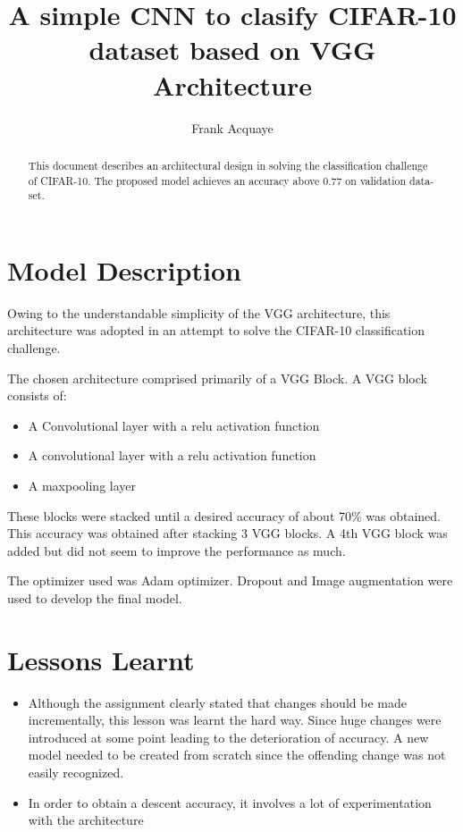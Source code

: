 \documentclass[]{article}
\title{A simple CNN to clasify CIFAR-10 dataset based on VGG Architecture}
\author{Frank Acquaye}
\begin{document}
\maketitle

\begin{abstract}
This document describes an architectural design in solving the classification challenge of CIFAR-10. The proposed model achieves an accuracy above 0.77 on validation data-set.
\end{abstract}

\section{Model Description}
Owing to the understandable simplicity of the VGG architecture, this architecture was adopted in an attempt to solve the CIFAR-10 classification challenge. 

The chosen architecture comprised primarily of a VGG Block. A VGG block consists of:
\begin{itemize}
	\item A Convolutional layer with a relu activation function
	\item A convolutional layer with a relu activation function
	\item A maxpooling layer
\end{itemize}

These blocks were stacked until a desired accuracy of about 70\% was obtained. This accuracy was obtained after stacking 3 VGG blocks. A 4th VGG block was added but did not seem to improve the performance as much.

The optimizer used was Adam optimizer.
Dropout and Image augmentation were used to develop the final model.

\section{Lessons Learnt}
\begin{itemize}
	\item Although the assignment clearly stated that changes should be made incrementally, this lesson was learnt the hard way. Since huge changes were introduced at some point leading to the deterioration of accuracy. A new model needed to be created from scratch since the offending change was not easily recognized.
	\item In order to obtain a descent accuracy, it involves a lot of experimentation with the architecture
\end{itemize}
\end{document}
